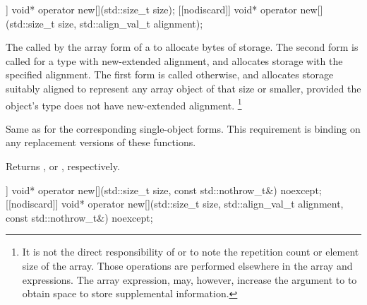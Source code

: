 %
\begin{itemdecl}
[[nodiscard]] void* operator new[](std::size_t size);
[[nodiscard]] void* operator new[](std::size_t size, std::align_val_t alignment);
\end{itemdecl}

\begin{itemdescr}
\pnum
\effects
The
called by the array form of a
to allocate
 bytes of storage.
The second form is called for a type with new-extended alignment,
and allocates storage
with the specified alignment.
The first form is called otherwise,
and allocates storage
suitably aligned to represent any array object of that size or smaller,
provided the object's type does not have new-extended alignment.%
\footnote{It is not the direct responsibility of
or
to note the repetition count or element size of the array.
Those operations are performed elsewhere in the array
and
expressions.
The array
expression, may, however, increase the  argument to
to obtain space to store supplemental information.}

\pnum
\replaceable
{}

\pnum
\required
Same as for
the corresponding single-object forms.
This requirement is binding on any replacement versions of these functions.

\pnum
{}
Returns
,
or
,
respectively.
\end{itemdescr}

%
\begin{itemdecl}
[[nodiscard]] void* operator new[](std::size_t size, const std::nothrow_t&) noexcept;
[[nodiscard]] void* operator new[](std::size_t size, std::align_val_t alignment,
                                   const std::nothrow_t&) noexcept;
\end{itemdecl}

